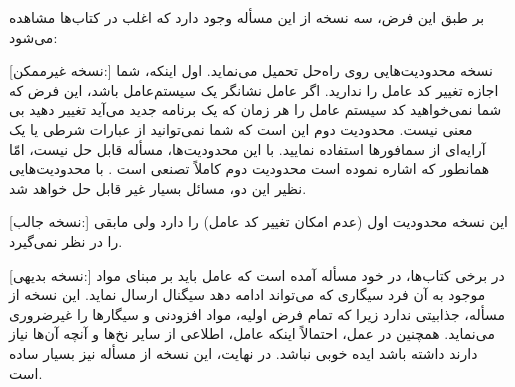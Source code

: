 \documentclass{book}
\begin{document}
    بر طبق این فرض، سه نسخه از این مسأله وجود دارد که اغلب در کتاب‌ها مشاهده می‌شود: 

\begin{description}

\item
    [نسخه غیرممکن:] نسخه  محدودیت‌هایی روی راه‌حل تحمیل می‌نماید. اول اینکه، شما اجازه تغییر کد عامل را ندارید. 
    اگر عامل نشانگر یک سیستم‌عامل باشد، این فرض که شما نمی‌خواهید کد سیستم عامل را هر زمان که یک برنامه جدید می‌آید تغییر دهید بی معنی نیست. 
    محدودیت دوم این است که شما نمی‌توانید از عبارات شرطی یا یک آرایه‌ای از سمافورها استفاده نمایید. با این محدودیت‌ها، 
    مسأله قابل حل نیست، امّا همانطور که   اشاره نموده است محدودیت دوم کاملاً تصنعی است  \cite{Parnas}. 
    با محدودیت‌هایی نظیر این دو، مسائل بسیار غیر قابل حل خواهد شد. 

\item
    [نسخه جالب:] این نسخه محدودیت اول (عدم امکان تغییر کد عامل) را دارد ولی مابقی را در نظر نمی‌گیرد.
    
\item
    [نسخه بدیهی:] در برخی کتاب‌ها، در خود مسأله آمده است که عامل باید بر مبنای مواد موجود به آن فرد سیگاری که می‌تواند ادامه دهد سیگنال ارسال نماید. 
    این نسخه از مسأله، جذابیتی ندارد زیرا که تمام فرض اولیه، مواد افزودنی و سیگارها را غیرضروری می‌نماید. همچنین در عمل، احتمالاً     
     اینکه عامل، اطلاعی از سایر نخ‌ها و آنچه آن‌ها نیاز دارند داشته باشد ایده خوبی نباشد. در نهایت،  این نسخه از مسأله نیز بسیار ساده است.
     
\end{description}
\end{document}

